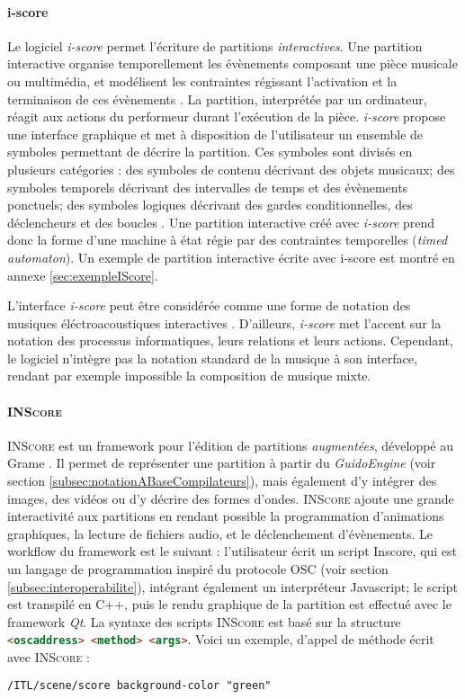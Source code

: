 \paragraph{i-score} Le logiciel \textit{i-score} permet l'écriture de partitions \textit{interactives}. Une partition interactive organise temporellement les évènements composant une pièce musicale ou multimédia, et modélisent les contraintes régissant l'activation et la terminaison de ces évènements \cite{arias2017}.
La partition, interprétée par un ordinateur, réagit aux actions du performeur durant l'exécution de la pièce.     
\textit{i-score} propose une interface graphique et met à disposition de l'utilisateur un ensemble de symboles permettant de décrire la partition. Ces symboles sont divisés en plusieurs catégories : des symboles de contenu décrivant des objets musicaux; des symboles temporels décrivant des intervalles de temps et des évènements ponctuels; des symboles logiques décrivant des gardes conditionnelles, des déclencheurs et des boucles \cite{delahogue2016}.   
Une partition interactive créé avec \textit{i-score} prend donc la forme d'une machine à état régie par des contraintes temporelles (\textit{timed automaton}). Un exemple de partition interactive écrite avec i-score est montré en annexe \ref{sec:exempleIScore}.
 
L'interface \textit{i-score} peut être considérée comme une forme de notation des musiques éléctroacoustiques interactives \cite{assayag2008}. D'ailleurs, \textit{i-score} met l'accent sur la notation des processus informatiques, leurs relations et leurs actions. Cependant, le logiciel n'intègre pas la notation standard de la musique à son interface, rendant par exemple impossible la composition de musique mixte.   

\paragraph{\textsc{INScore}} \textsc{INScore} est un framework pour l'édition de partitions \textit{augmentées}, développé au Grame \cite{fober2012}. Il permet de représenter une partition à partir du \textit{GuidoEngine} (voir section \ref{subsec:notationABaseCompilateurs}), mais également d'y intégrer des images, des vidéos ou d'y décrire des formes d'ondes. \textsc{INScore} ajoute une grande interactivité aux partitions en rendant possible la programmation d'animations graphiques, la lecture de fichiers audio, et le déclenchement d'évènements.    
Le workflow du framework est le suivant : l'utilisateur écrit un script Inscore, qui est un langage de programmation inspiré du protocole OSC (voir section \ref{subsec:interoperabilite}), intégrant également un interpréteur Javascript; le script est transpilé en C++, puis le rendu graphique de la partition est effectué avec le framework \textit{Qt}.
La syntaxe des scripts \textsc{INScore} est basé sur la structure \lstinline[language=html]|<oscaddress> <method> <args>|. Voici un exemple, d'appel de méthode écrit avec \textsc{INScore} :
\begin{lstlisting}[language=html]
/ITL/scene/score background-color "green"
\end{lstlisting}  

